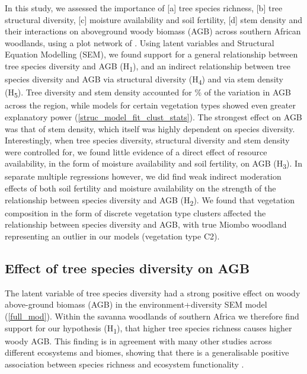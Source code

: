 \documentclass[11pt,a4paper]{article}
\begin{document}
In this study, we assessed the importance of [a] tree species richness, [b] tree structural diversity, [c] moisture availability and soil fertility, [d] stem density and their interactions on aboveground woody biomass (AGB) across southern African woodlands, using a plot network of \nplots{}. Using latent variables and Structural Equation Modelling (SEM), we found support for a general relationship between tree species diversity and AGB (H\textsubscript{1}), and an indirect relationship between tree species diversity and AGB via structural diversity (H\textsubscript{4}) and via stem density (H\textsubscript{5}). Tree diversity and stem density accounted for \srsq{}\% of the variation in AGB across the region, while models for certain vegetation types showed even greater explanatory power (\autoref{struc_model_fit_clust_stats}). The strongest effect on AGB was that of stem density, which itself was highly dependent on species diversity. Interestingly, when tree species diversity, structural diversity and stem density were controlled for, we found little evidence of a direct effect of resource availability, in the form of moisture availability and soil fertility, on AGB (H\textsubscript{3}). In separate multiple regressions however, we did find weak indirect moderation effects of both soil fertility and moisture availability on the strength of the relationship between species diversity and AGB (H\textsubscript{2}). We found that vegetation composition in the form of discrete vegetation type clusters affected the relationship between species diversity and AGB, with true Miombo woodland representing an outlier in our models (vegetation type C2).




\subsection{Effect of tree species diversity on AGB}

The latent variable of tree species diversity had a strong positive effect on woody above-ground biomass (AGB) in the environment+diversity SEM model (\autoref{full_mod}). Within the savanna woodlands of southern Africa we therefore find support for our hypothesis (H\textsubscript{1}), that higher tree species richness causes higher woody AGB. This finding is in agreement with many other studies across different ecosystems and biomes, showing that there is a generalisable positive association between species richness and ecosystem functionality \citep{Liang2016, Cardinale2009}. 
\end{document}
